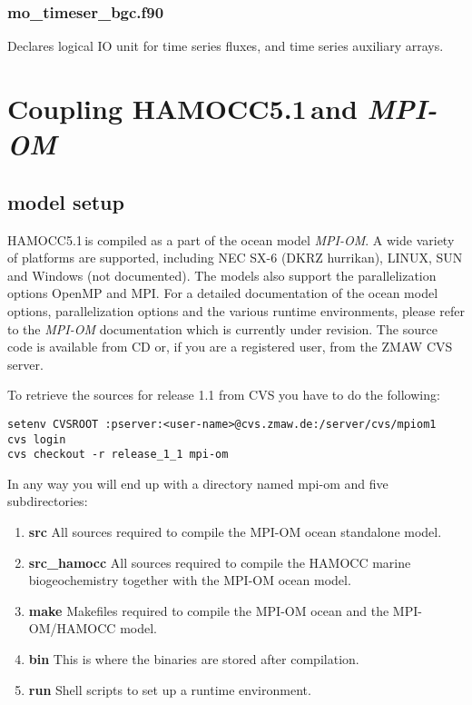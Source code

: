 \documentclass[11pt,a4paper,fleqn,twoside]{article}
\newcommand{\ham}{HAMOCC5.1\,}
\begin{document}
\subsubsection{mo\_timeser\_bgc.f90} Declares logical IO unit for time series
fluxes, and time series auxiliary arrays.

\section{\label{coupling}Coupling \ham and {\em MPI-OM}}
\subsection{\label{model_setup} model setup}


\ham is compiled as a part of the ocean model {\em MPI-OM}. A wide variety of platforms are supported, including
NEC SX-6 (DKRZ hurrikan), LINUX, SUN and Windows (not documented). The models also support the parallelization options
OpenMP and MPI.
For a detailed documentation of the ocean model options, parallelization options and
the various runtime environments, please refer to the {\em MPI-OM} documentation which is currently under revision.  
The source code is available from CD or, if you are a registered user, from the ZMAW CVS server.

To retrieve the sources for release 1.1 from CVS you have to do the following:
\begin{footnotesize}
\begin{verbatim}
setenv CVSROOT :pserver:<user-name>@cvs.zmaw.de:/server/cvs/mpiom1
cvs login
cvs checkout -r release_1_1 mpi-om 
\end{verbatim}
\end{footnotesize}

In any way you will end up with a directory named mpi-om and five subdirectories:

\begin{enumerate}

\item \textbf{src}  \newline 
All sources required to compile the MPI-OM ocean standalone model. 
 
\item \textbf{src\_hamocc} \newline 
All sources required to compile the HAMOCC marine biogeochemistry together with the MPI-OM ocean model. 

\item \textbf{make} \newline 
Makefiles required to compile the MPI-OM ocean and the MPI-OM/HAMOCC model. 

\item \textbf{bin} \newline 
This is where the binaries are stored after compilation. 

\item \textbf{run} \newline 
Shell scripts to set up a runtime environment. 

\end{enumerate}
\end{document}
